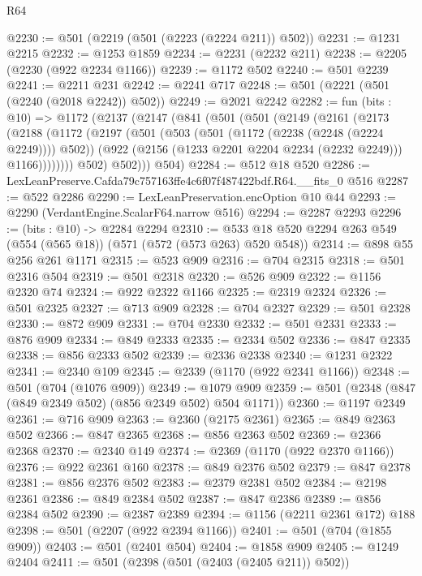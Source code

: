 \begin{lexlean}{R64}
\begin{coremodule}
@2230 := @501 (@2219 (@501 (@2223 (@2224 @211)) @502))
@2231 := @1231 @2215
@2232 := @1253 @1859
@2234 := @2231 (@2232 @211)
@2238 := @2205 (@2230 (@922 @2234 @1166))
@2239 := @1172 @502
@2240 := @501 @2239
@2241 := @2211 @231
@2242 := @2241 @717
@2248 := @501 (@2221 (@501 (@2240 (@2018 @2242)) @502))
@2249 := @2021 @2242
@2282 := fun (bits : @10) =>
  @1172
    (@2137
      (@2147
        (@841
          (@501
            (@501
              (@2149
                (@2161
                  (@2173
                    (@2188
                      (@1172
                        (@2197
                          (@501
                            (@503 (@501 (@1172 (@2238 (@2248 (@2224 @2249)))) @502))
                            (@922 (@2156 (@1233 @2201 @2204 @2234 (@2232 @2249))) @1166))))))))
              @502)
            @502)))
      @504)
@2284 := @512 @18 @520
@2286 := LexLeanPreserve.Cafda79c757163ffe4c6f07f487422bdf.R64.__fits_0 @516
@2287 := @522 @2286
@2290 := LexLeanPreservation.encOption @10 @44
@2293 := @2290 (VerdantEngine.ScalarF64.narrow @516)
@2294 := @2287 @2293
@2296 := (bits : @10) -> @2284 @2294
@2310 := @533 @18 @520 @2294 @263 @549 (@554 (@565 @18)) (@571 (@572 (@573 @263) @520 @548))
@2314 := @898 @55 @256 @261 @1171
@2315 := @523 @909
@2316 := @704 @2315
@2318 := @501 @2316 @504
@2319 := @501 @2318
@2320 := @526 @909
@2322 := @1156 @2320 @74
@2324 := @922 @2322 @1166
@2325 := @2319 @2324
@2326 := @501 @2325
@2327 := @713 @909
@2328 := @704 @2327
@2329 := @501 @2328
@2330 := @872 @909
@2331 := @704 @2330
@2332 := @501 @2331
@2333 := @876 @909
@2334 := @849 @2333
@2335 := @2334 @502
@2336 := @847 @2335
@2338 := @856 @2333 @502
@2339 := @2336 @2338
@2340 := @1231 @2322
@2341 := @2340 @109
@2345 := @2339 (@1170 (@922 @2341 @1166))
@2348 := @501 (@704 (@1076 @909))
@2349 := @1079 @909
@2359 := @501 (@2348 (@847 (@849 @2349 @502) (@856 @2349 @502) @504 @1171))
@2360 := @1197 @2349
@2361 := @716 @909
@2363 := @2360 (@2175 @2361)
@2365 := @849 @2363 @502
@2366 := @847 @2365
@2368 := @856 @2363 @502
@2369 := @2366 @2368
@2370 := @2340 @149
@2374 := @2369 (@1170 (@922 @2370 @1166))
@2376 := @922 @2361 @160
@2378 := @849 @2376 @502
@2379 := @847 @2378
@2381 := @856 @2376 @502
@2383 := @2379 @2381 @502
@2384 := @2198 @2361
@2386 := @849 @2384 @502
@2387 := @847 @2386
@2389 := @856 @2384 @502
@2390 := @2387 @2389
@2394 := @1156 (@2211 @2361 @172) @188
@2398 := @501 (@2207 (@922 @2394 @1166))
@2401 := @501 (@704 (@1855 @909))
@2403 := @501 (@2401 @504)
@2404 := @1858 @909
@2405 := @1249 @2404
@2411 := @501 (@2398 (@501 (@2403 (@2405 @211)) @502))

\end{coremodule}
\end{lexlean}

